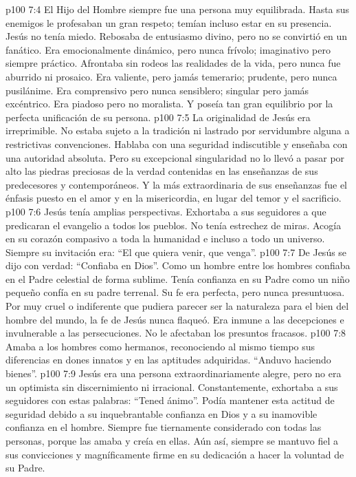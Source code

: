 \vs p100 7:4 El Hijo del Hombre siempre fue una persona muy equilibrada. Hasta sus enemigos le profesaban un gran respeto; temían incluso estar en su presencia. Jesús no tenía miedo. Rebosaba de entusiasmo divino, pero no se convirtió en un fanático. Era emocionalmente dinámico, pero nunca frívolo; imaginativo pero siempre práctico. Afrontaba sin rodeos las realidades de la vida, pero nunca fue aburrido ni prosaico. Era valiente, pero jamás temerario; prudente, pero nunca pusilánime. Era comprensivo pero nunca sensiblero; singular pero jamás excéntrico. Era piadoso pero no moralista. Y poseía tan gran equilibrio por la perfecta unificación de su persona.
\vs p100 7:5 La originalidad de Jesús era irreprimible. No estaba sujeto a la tradición ni lastrado por servidumbre alguna a restrictivas convenciones. Hablaba con una seguridad indiscutible y enseñaba con una autoridad absoluta. Pero su excepcional singularidad no lo llevó a pasar por alto las piedras preciosas de la verdad contenidas en las enseñanzas de sus predecesores y contemporáneos. Y la más extraordinaria de sus enseñanzas fue el énfasis puesto en el amor y en la misericordia, en lugar del temor y el sacrificio.
\vs p100 7:6 Jesús tenía amplias perspectivas. Exhortaba a sus seguidores a que predicaran el evangelio a todos los pueblos. No tenía estrechez de miras. Acogía en su corazón compasivo a toda la humanidad e incluso a todo un universo. Siempre su invitación era: “El que quiera venir, que venga”.
\vs p100 7:7 De Jesús se dijo con verdad: “Confiaba en Dios”. Como un hombre entre los hombres confiaba en el Padre celestial de forma sublime. Tenía confianza en su Padre como un niño pequeño confía en su padre terrenal. Su fe era perfecta, pero nunca presuntuosa. Por muy cruel o indiferente que pudiera parecer ser la naturaleza para el bien del hombre del mundo, la fe de Jesús nunca flaqueó. Era inmune a las decepciones e invulnerable a las persecuciones. No le afectaban los presuntos fracasos.
\vs p100 7:8 Amaba a los hombres como hermanos, reconociendo al mismo tiempo sus diferencias en dones innatos y en las aptitudes adquiridas. “Anduvo haciendo bienes”.
\vs p100 7:9 Jesús era una persona extraordinariamente alegre, pero no era un optimista sin discernimiento ni irracional. Constantemente, exhortaba a sus seguidores con estas palabras: “Tened ánimo”. Podía mantener esta actitud de seguridad debido a su inquebrantable confianza en Dios y a su inamovible confianza en el hombre. Siempre fue tiernamente considerado con todas las personas, porque las amaba y creía en ellas. Aún así, siempre se mantuvo fiel a sus convicciones y magníficamente firme en su dedicación a hacer la voluntad de su Padre.
